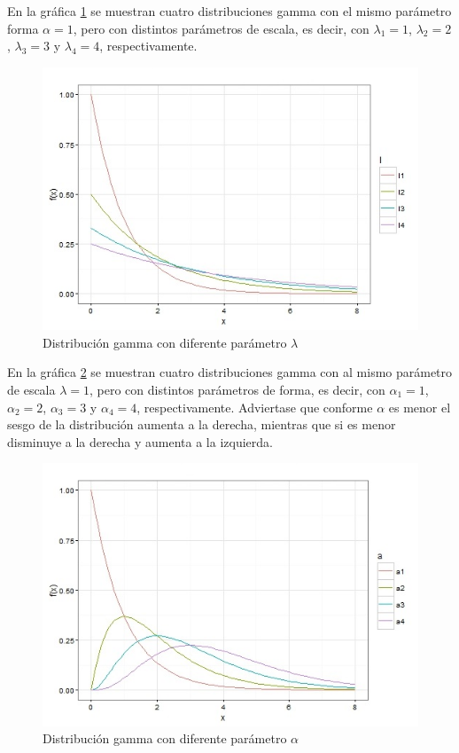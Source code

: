 En la gráfica \ref{fig:gammadifernetelambda} se muestran cuatro distribuciones gamma con el mismo parámetro forma $\alpha=1$, pero con distintos parámetros de escala, es decir, con $\lambda_{1}=1$, $\lambda_{2}=2$, $\lambda_{3}=3$ y $\lambda_{4}=4$, respectivamente. 
\begin{figure}[ht]
	\centering
	\includegraphics[width=0.85\linewidth]{Figuras/gammadifernetelambda}
	\caption{Distribución gamma con diferente parámetro $\lambda$}
	\label{fig:gammadifernetelambda}
\end{figure}

En la gráfica \ref{fig:gammaalfa} se muestran cuatro distribuciones gamma con al mismo parámetro de escala $\lambda=1$, pero con distintos parámetros de forma, es decir, con $\alpha_{1}=1$, $\alpha_{2}=2$, $\alpha_{3}=3$ y $\alpha_{4}=4$, respectivamente. Adviertase que conforme $\alpha$ es menor el sesgo de la distribución aumenta a la derecha, mientras que si es menor disminuye a la derecha y aumenta a la izquierda. 

\pagebreak

\begin{figure}
	\centering
	\includegraphics[width=0.8\linewidth]{Figuras/gammaalfa}
	\caption{Distribución gamma con diferente parámetro $\alpha$}
	\label{fig:gammaalfa}
\end{figure}

